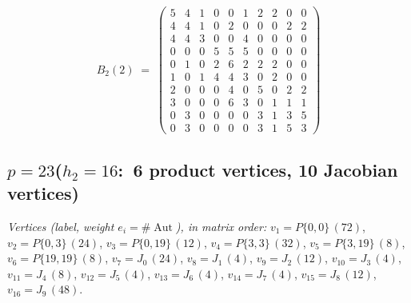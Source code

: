 \documentclass[11pt]{amsart}
\theoremstyle{plain}
\theoremstyle{definition}
\begin{document}
	\begingroup\small\setlength{\arraycolsep}{3.5pt}
	\[ B_2(2)\;=\;\left(\begin{array}{*{10}{r}}
		5 & 4 & 1 & 0 & 0 & 1 & 2 & 2 & 0 & 0 \\
		4 & 4 & 1 & 0 & 2 & 0 & 0 & 0 & 2 & 2 \\
		4 & 4 & 3 & 0 & 0 & 4 & 0 & 0 & 0 & 0 \\
		0 & 0 & 0 & 5 & 5 & 5 & 0 & 0 & 0 & 0 \\
		0 & 1 & 0 & 2 & 6 & 2 & 2 & 2 & 0 & 0 \\
		1 & 0 & 1 & 4 & 4 & 3 & 0 & 2 & 0 & 0 \\
		2 & 0 & 0 & 0 & 4 & 0 & 5 & 0 & 2 & 2 \\
		3 & 0 & 0 & 0 & 6 & 3 & 0 & 1 & 1 & 1 \\
		0 & 3 & 0 & 0 & 0 & 0 & 3 & 1 & 3 & 5 \\
		0 & 3 & 0 & 0 & 0 & 0 & 3 & 1 & 5 & 3
	\end{array}\right) \]
	\endgroup
	
	\subsection*{\texorpdfstring{$p=23$\quad ($h_2=16$:\ 6 product vertices, 10 Jacobian vertices)}{p=23 (h2=16: 6 product vertices, 10 Jacobian vertices)}}
	\begin{sloppypar}\noindent\footnotesize\textit{Vertices (label, weight $e_i=\#\operatorname{Aut}$), in matrix order:} $v_{1}{=}P\{0,0\}\,(72)$, $v_{2}{=}P\{0,3\}\,(24)$, $v_{3}{=}P\{0,19\}\,(12)$, $v_{4}{=}P\{3,3\}\,(32)$, $v_{5}{=}P\{3,19\}\,(8)$, $v_{6}{=}P\{19,19\}\,(8)$, $v_{7}{=}J_{0}\,(24)$, $v_{8}{=}J_{1}\,(4)$, $v_{9}{=}J_{2}\,(12)$, $v_{10}{=}J_{3}\,(4)$, $v_{11}{=}J_{4}\,(8)$, $v_{12}{=}J_{5}\,(4)$, $v_{13}{=}J_{6}\,(4)$, $v_{14}{=}J_{7}\,(4)$, $v_{15}{=}J_{8}\,(12)$, $v_{16}{=}J_{9}\,(48)$.\end{sloppypar}
	
\end{document}
